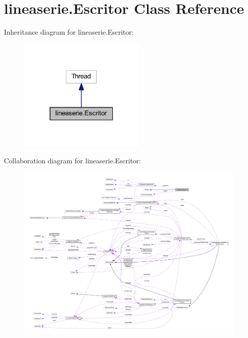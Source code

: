 \hypertarget{classlineaserie_1_1_escritor}{}\section{lineaserie.\+Escritor Class Reference}
\label{classlineaserie_1_1_escritor}


Inheritance diagram for lineaserie.\+Escritor\+:
\nopagebreak
\begin{figure}[H]
\begin{center}
\leavevmode
\includegraphics[width=175pt]{classlineaserie_1_1_escritor__inherit__graph}
\end{center}
\end{figure}


Collaboration diagram for lineaserie.\+Escritor\+:
\nopagebreak
\begin{figure}[H]
\begin{center}
\leavevmode
\includegraphics[width=350pt]{classlineaserie_1_1_escritor__coll__graph}
\end{center}
\end{figure}
